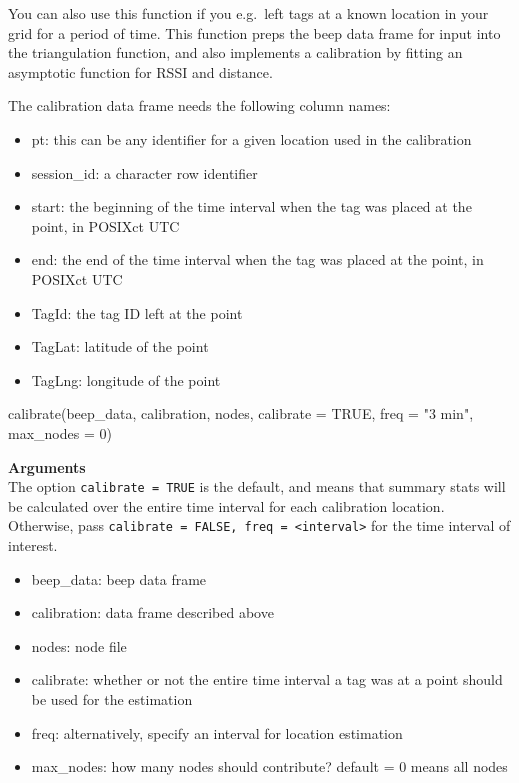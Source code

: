 \documentclass[
]{book}
\newenvironment{Shaded}{\begin{snugshade}}{\end{snugshade}}
\newcommand{\AttributeTok}[1]{\textcolor[rgb]{0.77,0.63,0.00}{#1}}
\newcommand{\ConstantTok}[1]{\textcolor[rgb]{0.00,0.00,0.00}{#1}}
\newcommand{\DecValTok}[1]{\textcolor[rgb]{0.00,0.00,0.81}{#1}}
\newcommand{\FunctionTok}[1]{\textcolor[rgb]{0.00,0.00,0.00}{#1}}
\newcommand{\NormalTok}[1]{#1}
\newcommand{\StringTok}[1]{\textcolor[rgb]{0.31,0.60,0.02}{#1}}
\providecommand{\tightlist}{%
  \setlength{\itemsep}{0pt}\setlength{\parskip}{0pt}}
\begin{document}
You can also use this function if you e.g.~left tags at a known location in your grid for a period of time. This function preps the beep data frame for input into the triangulation function, and also implements a calibration by fitting an asymptotic function for RSSI and distance.

The calibration data frame needs the following column names:

\begin{itemize}
\tightlist
\item
  pt: this can be any identifier for a given location used in the calibration\\
\item
  session\_id: a character row identifier
\item
  start: the beginning of the time interval when the tag was placed at the point, in POSIXct UTC\\
\item
  end: the end of the time interval when the tag was placed at the point, in POSIXct UTC\\
\item
  TagId: the tag ID left at the point\\
\item
  TagLat: latitude of the point\\
\item
  TagLng: longitude of the point
\end{itemize}

\begin{Shaded}
\begin{Highlighting}[]
\FunctionTok{calibrate}\NormalTok{(beep\_data, calibration, nodes, }\AttributeTok{calibrate =} \ConstantTok{TRUE}\NormalTok{, }\AttributeTok{freq =} \StringTok{"3 min"}\NormalTok{, }\AttributeTok{max\_nodes =} \DecValTok{0}\NormalTok{)}
\end{Highlighting}
\end{Shaded}

\textbf{Arguments}\\
The option \texttt{calibrate\ =\ TRUE} is the default, and means that summary stats will be calculated over the entire time interval for each calibration location. Otherwise, pass \texttt{calibrate\ =\ FALSE,\ freq\ =\ \textless{}interval\textgreater{}} for the time interval of interest.

\begin{itemize}
\tightlist
\item
  beep\_data: beep data frame\\
\item
  calibration: data frame described above\\
\item
  nodes: node file\\
\item
  calibrate: whether or not the entire time interval a tag was at a point should be used for the estimation
\item
  freq: alternatively, specify an interval for location estimation
\item
  max\_nodes: how many nodes should contribute? default = 0 means all nodes
\end{itemize}
\end{document}
